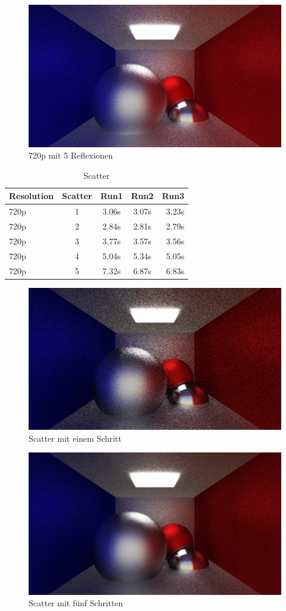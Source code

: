 \documentclass[sigconf]{acmart}
\begin{document}
\begin{figure}[t]
\centering
\includegraphics[width=0.7\linewidth]{img/bounce5.png}
\caption{720p mit 5 Reflexionen}
\label{Bounces5}
\end{figure}

\begin{table}[t]
 \caption{Scatter}

 \label{Scatter}
 \centering
 \small
 \begin{tabular}[h]{lcccr}
  \toprule
  Resolution & Scatter & Run1 & Run2 & Run3\\
  \midrule
  720p & 1 & 3.06s & 3.07s & 3.23s\\
  720p & 2 & 2.84s & 2.81s & 2.79s\\
  720p & 3 & 3.77s & 3.57s & 3.56s\\
  720p & 4 & 5.04s & 5.34s & 5.05s\\
  720p & 5 & 7.32s & 6.87s & 6.83s\\
  \bottomrule
 \end{tabular}
\end{table}

\begin{figure}[h]
\centering
\includegraphics[width=0.7\linewidth]{img/scatter1.png}
\caption{Scatter mit einem Schritt}
\label{Scatter1}
\end{figure}

\begin{figure}[h]
\centering
\includegraphics[width=0.7\linewidth]{img/scatter5.png}
\caption{Scatter mit fünf Schritten}
\label{Scatter5}
\end{figure}
\end{document}
